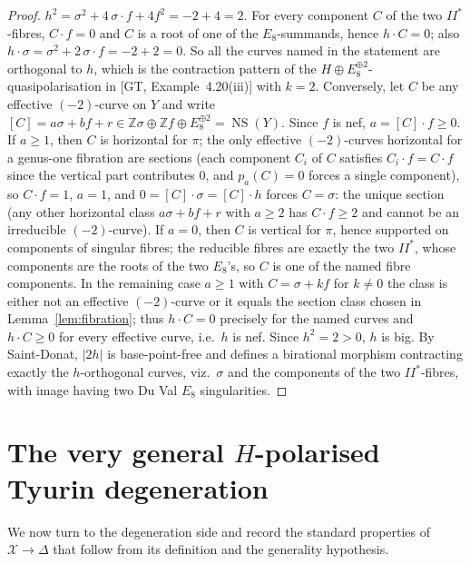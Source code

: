 \documentclass[11pt]{article}
\newcommand{\X}{\mathcal{X}}
\newcommand{\D}{\Delta}
\newcommand{\bZ}{\mathbb{Z}}
\DeclareMathOperator{\NS}{NS}
\begin{document}
\begin{proof}
$h^2=\sigma^2+4\,\sigma\cdot f + 4f^2=-2+4=2$. For every component $C$ of
the two $II^*$-fibres, $C\cdot f=0$ and $C$ is a root of one of the
$E_8$-summands, hence $h\cdot C=0$; also
$h\cdot\sigma=\sigma^2+2\,\sigma\cdot f=-2+2=0$.
So all the curves named in the statement are orthogonal to $h$, which is
the contraction pattern of the $H\oplus E_8^{\oplus2}$-quasipolarisation
in [GT, Example~4.20(iii)] with $k=2$. Conversely, let $C$ be any
effective $(-2)$-curve on $Y$ and write
$[C]=a\sigma+bf+r\in \bZ\sigma\oplus\bZ f\oplus E_8^{\oplus2}=\NS(Y)$.
Since $f$ is nef, $a=[C]\cdot f\ge0$. If $a\ge1$, then $C$ is horizontal
for $\pi$; the only effective $(-2)$-curves horizontal for a genus-one
fibration are sections (each component $C_i$ of $C$ satisfies
$C_i\cdot f=C\cdot f$ since the vertical part contributes $0$, and
$p_a(C)=0$ forces a single component), so $C\cdot f=1$, $a=1$, and
$0=[C]\cdot\sigma=[C]\cdot h$ forces $C=\sigma$: the unique section
(any other horizontal class $a\sigma+bf+r$ with $a\ge2$ has
$C\cdot f\ge2$ and cannot be an irreducible $(-2)$-curve). If $a=0$,
then $C$ is vertical for $\pi$, hence supported on components of
singular fibres; the reducible fibres are exactly the two $II^*$, whose
components are the roots of the two $E_8$'s, so $C$ is one of the named
fibre components. In the remaining case $a\ge1$ with $C=\sigma+kf$ for
$k\neq0$ the class is either not an effective $(-2)$-curve or it equals
the section class chosen in Lemma~\ref{lem:fibration}; thus
$h\cdot C=0$ precisely for the named curves and $h\cdot C\ge 0$
for every effective curve, i.e.\ $h$ is nef. Since $h^2=2>0$, $h$ is big.
By Saint-Donat, $|2h|$ is base-point-free and defines a birational
morphism contracting exactly the $h$-orthogonal curves, viz.\ $\sigma$ and
the components of the two $II^*$-fibres, with image having two Du Val
$E_8$ singularities.
\end{proof}

\section{The very general \texorpdfstring{$H$}{H}-polarised Tyurin
degeneration}\label{sec:degeneration}

We now turn to the degeneration side and record the standard properties of
$\X\to\D$ that follow from its definition and the generality hypothesis.
\end{document}
